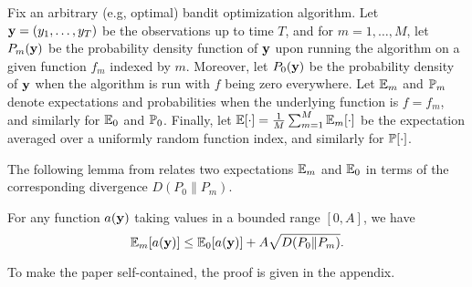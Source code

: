 \documentclass[english,onecolumn,final,11pt]{IEEEtran} %
\begin{document}
Fix an arbitrary (e.g, optimal) bandit optimization algorithm.  Let $\mathbf{y} = (y_1,\dotsc,y_T)$ be the observations up to time $T$, and for $m=1,\dotsc,M$, let $P_m(\mathbf{y})$ be the probability density function of $\mathbf{y}$ upon running the algorithm on a given function $f_m$ indexed by $m$.  Moreover, let $P_0(\mathbf{y})$ be the probability density of $\mathbf{y}$ when the algorithm is run with $f$ being zero everywhere.  
Let $\mathbb{E}_m$ and $\mathbb{P}_m$ denote expectations and probabilities when the underlying function is $f = f_m$, and similarly for $\mathbb{E}_0$ and $\mathbb{P}_0$.  Finally, let $\mathbb{E}[\cdot] = \frac{1}{M}\sum_{m=1}^M \mathbb{E}_m[\cdot]$ be the expectation averaged over a uniformly random function index, and similarly for $\mathbb{P}[\cdot]$.

The following lemma from \cite{Aue95} relates two expectations $\mathbb{E}_m$ and $\mathbb{E}_0$ in terms of the corresponding divergence $D(P_0\|P_m)$.

\begin{lemma} \emph{\cite[p.~27]{Aue95}} \label{lem:auer}
	For any function $a(\mathbf{y})$ taking values in a bounded range $[0,A]$, we have
	\begin{equation}
		\mathbb{E}_m[a(\mathbf{y})] \le \mathbb{E}_0[a(\mathbf{y})] + A \sqrt{ D(P_0 \| P_m) }. \label{eq:auer_bound}
	\end{equation}
\end{lemma}
\noindent To make the paper self-contained, the proof is given in the appendix.
\end{document}
